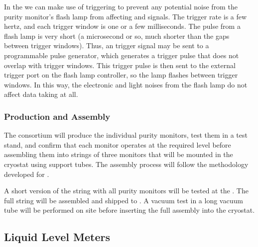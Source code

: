 In the  we can make use of triggering to prevent any potential noise from the purity monitor's flash lamp from affecting  and  signals. The  trigger rate is a few hertz, and each trigger window is one or a few milliseconds. %
The pulse from a flash lamp is very short (a microsecond or so, much shorter than the gaps between  trigger windows). 
Thus, an  trigger signal may be sent to a programmable pulse generator, %
which generates a trigger pulse that does not overlap with  trigger windows. This trigger pulse %
is then sent to the external trigger port on the flash lamp  controller, so the lamp flashes between  trigger windows. In this way, the electronic and light noises from the flash lamp do %
not affect %
data taking at all.


\subsubsection{Production and Assembly}
\label{sec:PrMon-Production-Assembly}

The  consortium will produce the individual purity monitors, test them in a test stand, and confirm that each monitor operates at the required level before assembling them into strings of three monitors that will be mounted in the  cryostat using support tubes. The assembly process will follow the methodology developed for .



A short version of the %
string
with all purity monitors will be tested at the . 
The full string will be assembled and shipped to \surf. 
 A vacuum test in a long vacuum tube will be performed on site before inserting the full assembly into the  cryostat. 


\subsection{Liquid Level Meters}


